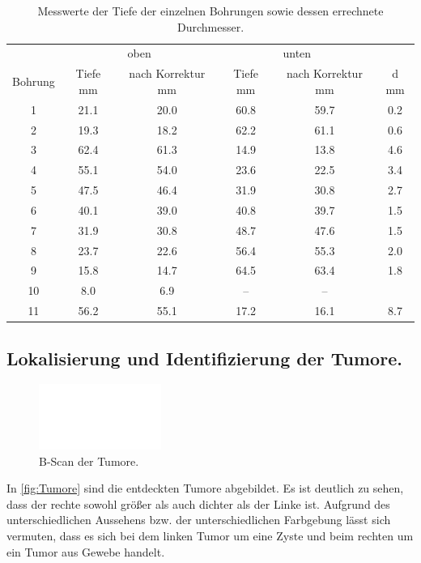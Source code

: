 \begin{table}
    \centering 
    \caption{Messwerte der Tiefe der einzelnen Bohrungen sowie dessen errechnete Durchmesser.}
\begin{tabular}{c | c c | c c | c}
    \toprule
    & \multicolumn{2}{c}{oben}& \multicolumn{2}{c}{unten} & \\
    Bohrung & Tiefe \/\unit{\mm} &  nach Korrektur \/\unit{\mm}& Tiefe \/ \unit{\mm} & nach Korrektur \/ \unit{\mm} & d \/ \unit{\mm}\\
    \midrule
           1 & 21.1 & 20.0 & 60.8 & 59.7 & 0.2\\
           2 & 19.3 & 18.2 & 62.2 & 61.1 & 0.6\\
           3 & 62.4 & 61.3 & 14.9 & 13.8 & 4.6\\
           4 & 55.1 & 54.0 & 23.6 & 22.5 & 3.4\\
           5 & 47.5 & 46.4 & 31.9 & 30.8 & 2.7\\
           6 & 40.1 & 39.0 & 40.8 & 39.7 & 1.5\\
           7 & 31.9 & 30.8 & 48.7 & 47.6 & 1.5\\
           8 & 23.7 & 22.6 & 56.4 & 55.3 & 2.0\\
           9 & 15.8 & 14.7 & 64.5 & 63.4 & 1.8\\
           10& 8.0  & 6.9  & -- & -- &     \\
           11& 56.2 & 55.1 & 17.2 & 16.1 & 8.7\\
    \bottomrule
    \end{tabular}
    \label{tab:BScan}
\end{table}

\subsection{Lokalisierung und Identifizierung der Tumore.}
\begin{figure}
    \centering
    \includegraphics[width = 4cm]{vier.pdf}
    \caption{B-Scan der Tumore.}
    \label{fig:Tumore}
\end{figure}
In \autoref{fig:Tumore} sind die entdeckten Tumore abgebildet. Es ist deutlich zu sehen, dass der rechte sowohl größer als auch dichter als der Linke ist. Aufgrund des unterschiedlichen Aussehens bzw. der
unterschiedlichen Farbgebung lässt sich vermuten, dass es sich bei dem linken Tumor um eine Zyste und beim rechten um ein Tumor aus Gewebe handelt.
